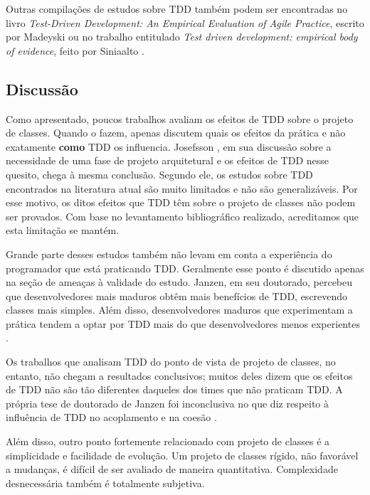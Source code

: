Outras compilações de estudos sobre TDD também podem ser encontradas no livro
\textit{Test-Driven Development: An Empirical Evaluation of Agile Practice},
escrito por Madeyski \cite{madeyski-livro} ou no trabalho entitulado
\textit{Test driven development: empirical body of evidence}, feito por
Siniaalto \cite{tdd-body-of-evidence}.

\subsection{Discussão}

Como apresentado, poucos trabalhos avaliam os efeitos de TDD sobre o
projeto de classes. Quando o fazem, apenas discutem quais os efeitos da prática
e não exatamente \textbf{como} TDD os influencia. Josefsson
\cite{josefsson}, em sua discussão sobre a necessidade de uma fase de projeto
arquitetural e os efeitos de TDD nesse quesito, chega à mesma conclusão. Segundo
ele, os estudos sobre TDD encontrados na literatura atual são muito limitados e
não são generalizáveis. Por esse motivo, os ditos efeitos que TDD têm 
sobre o projeto de classes não podem ser provados. Com base no levantamento
bibliográfico realizado, acreditamos que esta limitação se mantém.

Grande parte desses estudos também não levam em conta a experiência do
programador que está praticando TDD. Geralmente esse ponto é discutido apenas 
na seção de ameaças à validade do estudo. Janzen, em seu doutorado, percebeu que
desenvolvedores mais maduros obtêm mais benefícios de TDD, escrevendo classes
mais simples. Além disso, desenvolvedores maduros que experimentam a prática
tendem a optar por TDD mais do que desenvolvedores menos experientes
\cite{janzen-phd}.

Os trabalhos que analisam TDD do ponto de vista de projeto de classes, no entanto, não
chegam a resultados conclusivos; muitos deles dizem que os efeitos
de TDD não são tão diferentes daqueles dos times que não praticam TDD.  A própria tese de
doutorado de Janzen foi inconclusiva no que diz respeito à influência de TDD no 
acoplamento e na coesão \cite{janzen-phd}. 

Além disso, outro ponto fortemente relacionado com projeto de classes é a simplicidade e
facilidade de evolução. Um projeto de classes rígido, não favorável a mudanças,  é difícil de ser 
avaliado de maneira quantitativa. Complexidade
desnecessária também é totalmente subjetiva. 

